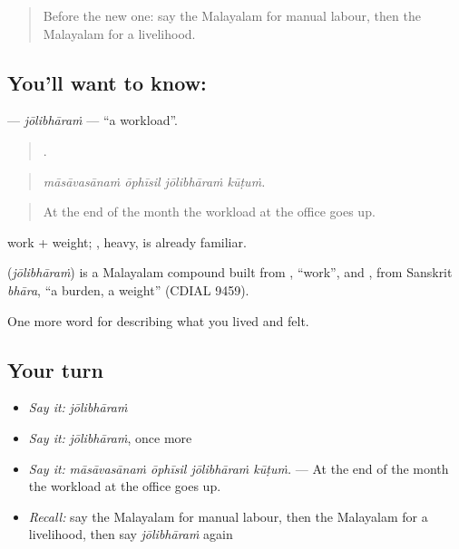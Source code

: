 \label{lesson:ML-C546-jolibharam}



\begin{quote}
Before the new one: say the Malayalam for manual labour, then the Malayalam for a livelihood.
\end{quote}

\subsection*{You'll want to know: }
\textbf{} — \emph{jōlibhāraṁ} — \textquotedblleft{}a workload\textquotedblright{}.

\begin{quote}
   .
\end{quote}

\begin{quote}
\emph{māsāvasānaṁ ōphīsil jōlibhāraṁ kūṭuṁ.}
\end{quote}

\begin{quote}
At the end of the month the workload at the office goes up.
\end{quote}

 work +  weight; , heavy, is already familiar.

\begin{cousinweb}
\textbf{} (\emph{jōlibhāraṁ}) is a Malayalam compound built from , \textquotedblleft{}work\textquotedblright{}, and , from Sanskrit \emph{bhāra}, \textquotedblleft{}a burden, a weight\textquotedblright{} (CDIAL 9459).
\end{cousinweb}

\begin{grammarlens}[title={What you've built}]
One more word for describing what you lived and felt.
\end{grammarlens}

\subsection*{Your turn}
\begin{itemize}
\raggedright
  \item \emph{Say it:} \emph{jōlibhāraṁ}
  \item \emph{Say it:} \emph{jōlibhāraṁ}, once more
  \item \emph{Say it:} \emph{māsāvasānaṁ ōphīsil jōlibhāraṁ kūṭuṁ.} — At the end of the month the workload at the office goes up.
  \item \emph{Recall:} say the Malayalam for manual labour, then the Malayalam for a livelihood, then say \emph{jōlibhāraṁ} again
\end{itemize}

